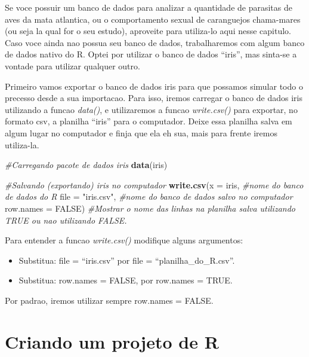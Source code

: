 \documentclass[
]{book}
\newenvironment{Shaded}{\begin{snugshade}}{\end{snugshade}}
\newcommand{\AttributeTok}[1]{\textcolor[rgb]{0.13,0.29,0.53}{#1}}
\newcommand{\CommentTok}[1]{\textcolor[rgb]{0.56,0.35,0.01}{\textit{#1}}}
\newcommand{\ConstantTok}[1]{\textcolor[rgb]{0.56,0.35,0.01}{#1}}
\newcommand{\FunctionTok}[1]{\textcolor[rgb]{0.13,0.29,0.53}{\textbf{#1}}}
\newcommand{\NormalTok}[1]{#1}
\newcommand{\StringTok}[1]{\textcolor[rgb]{0.31,0.60,0.02}{#1}}
\providecommand{\tightlist}{%
  \setlength{\itemsep}{0pt}\setlength{\parskip}{0pt}}
\begin{document}
Se voce possuir um banco de dados para analizar a quantidade de parasitas de aves da mata atlantica, ou o comportamento sexual de caranguejos chama-mares (ou seja la qual for o seu estudo), aproveite para utiliza-lo aqui nesse capitulo. Caso voce ainda nao possua seu banco de dados, trabalharemos com algum banco de dados nativo do R. Optei por utilizar o banco de dados ``iris'', mas sinta-se a vontade para utilizar qualquer outro.

Primeiro vamos exportar o banco de dados iris para que possamos simular todo o precesso desde a sua importacao. Para isso, iremos carregar o banco de dados iris utilizando a funcao \emph{data()}, e utilizaremos a funcao \emph{write.csv()} para exportar, no formato csv, a planilha ``iris'' para o computador. Deixe essa planilha salva em algum lugar no computador e finja que ela eh sua, mais para frente iremos utiliza-la.

\begin{Shaded}
\begin{Highlighting}[]

\CommentTok{\#Carregando pacote de dados iris}
\FunctionTok{data}\NormalTok{(iris)}

\CommentTok{\#Salvando (exportando) iris no computador}
\FunctionTok{write.csv}\NormalTok{(}\AttributeTok{x =}\NormalTok{ iris,            }\CommentTok{\#nome do banco de dados do R}
          \AttributeTok{file =} \StringTok{"iris.csv"}\NormalTok{,   }\CommentTok{\#nome do banco de dados salvo no computador}
          \AttributeTok{row.names =} \ConstantTok{FALSE}\NormalTok{)   }\CommentTok{\#Mostrar o nome das linhas na planilha salva utilizando TRUE ou nao utilizando FALSE.}
\end{Highlighting}
\end{Shaded}

Para entender a funcao \emph{write.csv()} modifique alguns argumentos:

\begin{itemize}
\tightlist
\item
  Substitua: file = ``iris.csv'' por file = ``planilha\_do\_R.csv''.
\item
  Substitua: row.names = FALSE, por row.names = TRUE.
\end{itemize}

Por padrao, iremos utilizar sempre row.names = FALSE.

\hypertarget{criando-um-projeto-de-r}{%
\section{Criando um projeto de R}\label{criando-um-projeto-de-r}}
\end{document}
